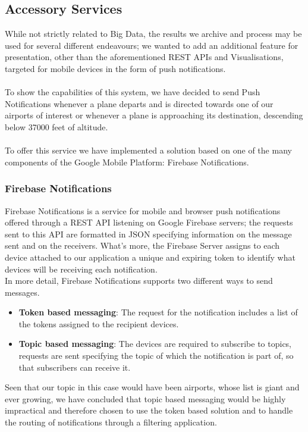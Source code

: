 \subsection{Accessory Services}

While not strictly related to Big Data, the results we archive and process may be used for several different endeavours; we wanted to add an additional feature for presentation, other than the aforementioned REST APIs and Visualisations, targeted for mobile devices in the form of push notifications.
\\ \\
To show the capabilities of this system, we have decided to send Push Notifications whenever a plane departs and is directed towards one of our airports of interest or whenever a plane is approaching its destination, descending below 37000 feet of altitude.
\\ \\
To offer this service we have implemented a solution based on one of the many components of the Google Mobile Platform: Firebase Notifications.

\subsubsection{Firebase Notifications}

Firebase Notifications is a service for mobile and browser push notifications offered through a REST API listening on Google Firebase servers; the requests sent to this API are formatted in JSON specifying information on the message sent and on the receivers.
What's more, the Firebase Server assigns to each device attached to our application a unique and expiring token to identify what devices will be receiving each notification.
\\
In more detail, Firebase Notifications supports two different ways to send messages.

\begin{itemize}
	\item \textbf{Token based messaging}: The request for the notification includes a list of the tokens assigned to the recipient devices. 
	\item \textbf{Topic based messaging}: The devices are required to subscribe to topics, requests are sent specifying the topic of which the notification is part of, so that subscribers can receive it.
\end{itemize}  

Seen that our topic in this case would have been airports, whose list is giant and ever growing, we have concluded that topic based messaging would be highly impractical and therefore chosen to use the token based solution and to handle the routing of notifications through a filtering application.

